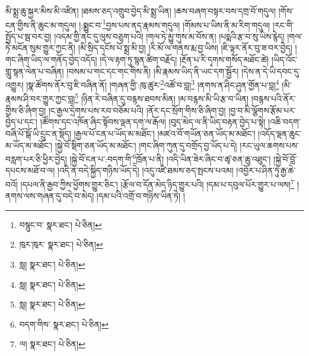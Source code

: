 མི་སྨྲ་ཆུ་སྐྱར་མིས་མི་འཛིན། །ཐམས་ཅད་འགྲུབ་བྱེད་མི་སྨྲ་ཡིན། །ཆས་བཞག་བསྟར་བས་དགྲ་བོ་གདུལ། །གོས་ངན་གྱིས་ནི་ཆུང་མ་གདུལ། །:སྨྱུང་བ་\footnote{བསྙུང་བ་  སྣར་ཐང་།  པེ་ཅིན། }བྱས་པས་ནད་རྣམས་གདུལ། །གོམས་པ་ཡིས་ནི་མ་རིག་གདུལ། །རང་གི་སྤྱོད་པ་སྦ་བར་བྱ། །འདམ་གྱི་ནང་དུ་ལུས་བཅུག་པའི། །གལ་ཏེ་མྱུ་གུས་མ་བོས་ན། །པདྨའི་རྩ་བ་སུ་ཡིས་རྙེད། །གལ་ཏེ་མངོན་སུམ་གྱུར་ཀྱང་ནི། །མི་སྲིད་དངོས་པོ་སྨྲ་མི་བྱ། །རི་མོ་ལ་གནས་རྨ་བྱ་ཡིས། །ཇི་ལྟར་ནོར་བུ་ཟ་བར་བྱེད། །གང་ཞིག་ཡིད་ལ་གནོད་བྱེད་འདོད། །དེ་ལ་རྟག་ཏུ་སྙན་ཚིག་བརྗོད། །རྔོན་པ་རི་དྭགས་གསོད་མཐོང་ཚེ། །ཡིད་འོང་གླུ་སྙན་ལེན་པ་བཞིན། །བསམ་པ་གང་དང་གང་གིས་ནི། །མི་རྣམས་ཡིད་ནི་ཡང་དག་སྦྱོར། །དེས་ན་དེ་ཡི་དབང་དུ་འགྱུར། །སྣ་ཚོགས་ནོར་བུ་ཇི་བཞིན་ནོ། །གཞན་གྱི་:ཁུ་ཚུར་\footnote{ཁུར་ཁུར་  སྣར་ཐང་།  པེ་ཅིན། }འཚོ་བ་བླ།\footnote{སླ།  སྣར་ཐང་།  པེ་ཅིན། } །ནགས་ན་ཤིང་ཤུན་གྱོན་པ་བླ།\footnote{སླ།  སྣར་ཐང་།  པེ་ཅིན། } །མི་རྣམས་ཤི་བར་གྱུར་ཀྱང་བླ།\footnote{སླ།  སྣར་ཐང་།  པེ་ཅིན། } །ཉིན་རེ་བཞིན་དུ་བརྙས་ཐབས་མིན། །མ་བརྙས་མི་ཡི་རྩ་བ་ཡིན། །བརྙས་པའི་ནོར་གྱིས་ཅི་ཞིག་བྱ། །ང་རྒྱལ་དྲེགས་པས་རབ་བཅོམ་པའི། །ནོར་དང་སྲོག་གིས་ཅི་ཞིག་བྱ། །བྱ་བ་མི་ལྕོགས་རྩོམ་པར་བྱེད་པ་དང་། །ཚོགས་དང་འཁོན་ཞིང་སྟོབས་ལྡན་དག་ལ་རྒོལ། །བུད་མེད་ལ་ནི་ཡིད་བརྟན་བྱེད་པ་སྟེ། །འཆི་བདག་བཞི་པོ་སྒོ་ཡི་དྲུང་ན་སྡོད། །རྒྱལ་པོ་ངན་པ་ཡོད་མ་མཐོང་། །མཛའ་བོ་གཡོན་ཅན་ཡོད་མ་མཐོང་། །འདོད་ལྡན་ཆུང་མ་ཡོད་མ་མཐོང་། །སྐྱེ་བོ་སྡིག་ཅན་ཡོད་མ་མཐོང་། །གང་ཞིག་ཀུན་དུ་བགྲོད་བྱ་ཡོད་པ་དེ། །རང་ཡུལ་ཆགས་པས་བརླག་པར་ཅི་ཕྱིར་བྱེད། །སྐྱེ་བོ་ངན་པ་:བདག་གི་\footnote{བདག་གིས་  སྣར་ཐང་།  པེ་ཅིན། }ཁྲོན་པ་ནི། །འདི་ཡིན་ཟེར་ཞིང་བ་ཚྭ་ཅན་ཆུ་འཐུང་། །སྐྱེ་བོ་བློ་དཔངས་མཐོ་བ་ལ། །འདི་ན་བདེ་སྐྱིད་གཉིས་ཡོད་དེ། །འདུ་འཛི་ཐམས་ཅད་སྤངས་པའམ། །འབྱོར་པ་ཤིན་ཏུ་རྒྱ་ཆེ་བའོ། །དཔལ་ནི་རྒྱབ་ཀྱིས་ཕྱོགས་གྱུར་ཅིང་། །རྩོལ་བ་དོན་མེད་ཉིད་གྱུར་པའི། །དམ་པ་དབུལ་པོར་གྱུར་པ་ལས།\footnote{ལ།  སྣར་ཐང་།  པེ་ཅིན། } །ནགས་ལས་གཞན་དུ་བདེ་བ་མེད། །དམ་པའི་འགྲོ་བ་གཉིས་ཡིན་ཏེ། །
